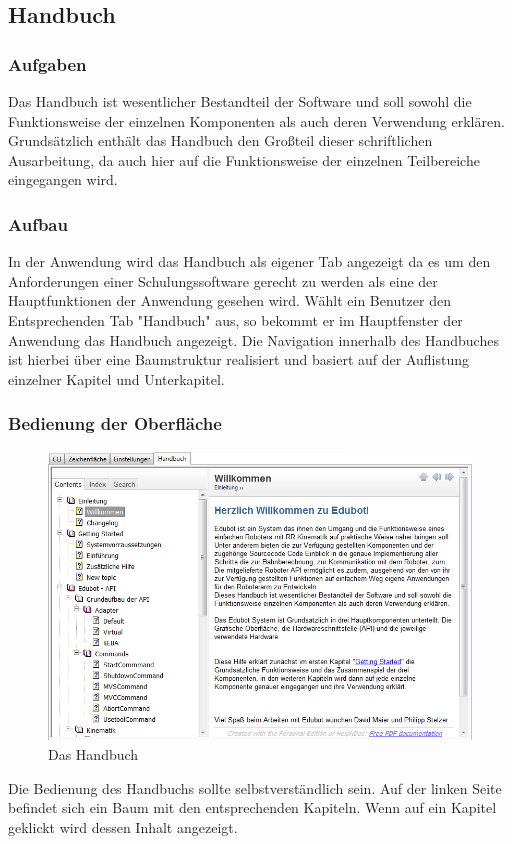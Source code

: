 \subsection{Handbuch}
\subsubsection{Aufgaben}
Das Handbuch ist wesentlicher Bestandteil der Software und soll sowohl die Funktionsweise der einzelnen Komponenten als auch deren Verwendung erklären. Grundsätzlich enthält das Handbuch den Großteil dieser schriftlichen Ausarbeitung, da auch hier auf die Funktionsweise der einzelnen Teilbereiche eingegangen wird. 

\subsubsection{Aufbau}
In der Anwendung wird das Handbuch als eigener Tab angezeigt da es um den Anforderungen einer Schulungssoftware gerecht zu werden als eine der Hauptfunktionen der Anwendung gesehen wird. Wählt ein Benutzer den Entsprechenden Tab "Handbuch" aus, so bekommt er im Hauptfenster der Anwendung das Handbuch angezeigt. 
Die Navigation innerhalb des Handbuches ist hierbei über eine Baumstruktur realisiert und basiert auf der Auflistung einzelner Kapitel und Unterkapitel.

\subsubsection{Bedienung der Oberfläche}
\begin{figure}[H]
  \centering
  \begin{minipage}[t]{12 cm}
  	\centering
  	\includegraphics[width=12cm]{images/Manual} 
    \caption{Das Handbuch}
  \end{minipage}
\end{figure}
Die Bedienung des Handbuchs sollte selbstverständlich sein. Auf der linken Seite befindet sich ein Baum mit den entsprechenden Kapiteln. Wenn auf ein Kapitel geklickt wird dessen Inhalt angezeigt.

